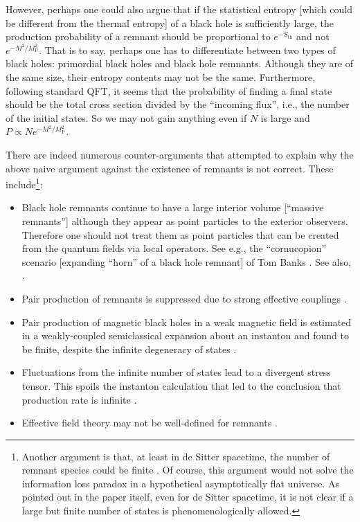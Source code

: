 \documentclass[12pt]{article}
\newcommand{\2}{$^2$}
\newcommand{\3}{$^3$}
\newcommand{\4}{$_4$}
\newcommand{\5}{$_5$}
\begin{document}
However, perhaps one could also argue that if the statistical entropy [which could be different from the thermal entropy] of a black hole is sufficiently large, the production probability of a remnant should be proportional to $e^{-S_{\mathrm{th}}}$ and not $e^{-M^{2}/M_{\text{P}}^2}$. That is to say, perhaps one has to differentiate between two types of black holes: primordial black holes and black hole remnants. Although they are of the same size, their entropy contents may not be the same.
Furthermore, following standard QFT, it seems that the probability of finding a final state should be the total cross section divided by the ``incoming flux'', i.e., the number of the initial states. So we may not gain anything even if $N$ is large and $P \propto N e^{-M^{2}/M_{\text{P}}^2}$.

There are indeed numerous counter-arguments that attempted to explain why the above naive argument against the existence of remnants is not correct. These include\footnote{Another argument is that, at least in de Sitter spacetime, the number of remnant species could be finite \cite{0803.2467}. Of course, this argument would not solve the information loss paradox in a hypothetical asymptotically flat universe. As pointed out in the paper itself, even for de Sitter spacetime, it is not clear if a large but finite number of states is phenomenologically allowed.}:
\begin{itemize}
\item[(1)] Black hole remnants continue to have a large interior volume [``massive remnants''] although they appear as point particles to the exterior observers. Therefore one should not treat them as point particles that can be created from the quantum fields via local operators. See e.g., the ``cornucopion'' scenario [expanding ``horn'' of a black hole
remnant] of Tom Banks \cite{Banks}. See also, \cite{piran}.
\item[(2)] Pair production of remnants is suppressed due to strong effective couplings \cite{Giddings3}.
\item[(3)] Pair production of magnetic black holes in a weak magnetic field is estimated in a weakly-coupled semiclassical expansion about an instanton and found to be finite, despite the infinite degeneracy of states \cite{BLS}.
\item[(4)] Fluctuations from the infinite number of states lead to a divergent stress tensor. This spoils the instanton calculation that led to the conclusion that production rate is infinite \cite{Giddings01}. 
\item[(5)] Effective field theory may not be well-defined for remnants \cite{sabine}. 
\end{itemize}
\end{document}
